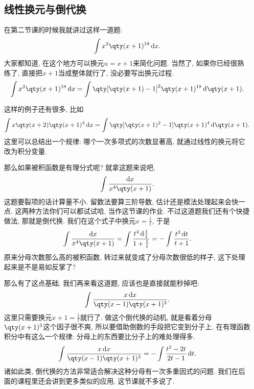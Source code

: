 \documentclass{ctexbook}
\newcommand*{\dif}{\mathop{}\!\mathrm{d}}
\begin{document}
{\subsection{线性换元与倒代换}
在第二节课的时候我就讲过这样一道题: 
\begin{align*}
\int x^{2}\qty(x+1)^{18}\dif{x}
.\end{align*}
大家都知道, 在这个地方可以换元$u=x+1$来简化问题. 当然了, 如果你已经很熟练了, 直接把$x+1$当成整体就行了, 没必要写出换元过程. 
\begin{align*}
\int x^{2}\qty(x+1)^{18}\dif{x}=\int\qty[\qty(x+1)-1]^{2}\qty(x+1)^{18}\dif{\qty(x+1)}
.\end{align*}\par
这样的例子还有很多, 比如
\begin{align*}
\int x\qty(x+2)\qty(x+1)^{4}\dif{x}=\int\qty[\qty(x+1)^{2}-1]\qty(x+1)^{4}\dif{\qty(x+1)}
.\end{align*}
这里可以总结出一个规律: 哪个一次多项式的次数显著高, 就通过线性的换元将它改为积分变量. \par
那么如果被积函数是有理分式呢? 就拿这题来说吧, 
\begin{align*}
\int\frac{\dif{x}}{x^{4}\qty(x+1)}
.\end{align*}
这题要裂项的话计算量不小. 留数法要算三阶导数, 估计还是模法处理起来会快一点. 这两种方法你们可以都试试哈, 当作这节课的作业. 不过这道题我们还有个快捷做法, 那就是倒代换. 我们在这个式子中换元$x=\frac{1}{t}$, 于是
\begin{align*}
\int\frac{\dif{x}}{x^{4}\qty(x+1)}=\int\frac{t^{4}\dif{\frac{1}{t}}}{1+\frac{1}{t}}=-\int\frac{t^{3}\dif{t}}{t+1}
.\end{align*}
原来分母次数那么高的被积函数, 转过来就变成了分母次数很低的样子, 这下处理起来是不是易如反掌了? \par
那么有了这点基础, 我们再来看这道题, 应该也是直接就能秒掉吧: 
\begin{align*}
\int\frac{x\dif{x}}{\qty(x-1)\qty(x+1)^{3}}
.\end{align*}
这里只需要换元$x+1=\frac{1}{t}$就行了. 做这个倒代换的动机, 就是看着分母$\qty(x+1)^{3}$这个因子很不爽, 所以要借助倒数的手段把它变到分子上. 在有理函数积分中有这么一个规律: 分母上的东西要比分子上的难处理得多. 
\begin{align*}
\int\frac{x\dif{x}}{\qty(x-1)\qty(x+1)^{3}}=-\int\frac{t^{2}-2t}{2t-1}\dif{t}
.\end{align*}
诸如此类, 倒代换的方法非常适合解决这种分母有一次多重因式的问题. 我们在后面的课程里还会讲到更多类似的应用, 这节课就不多说了. \par
}
\end{document}
